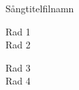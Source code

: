\begin{song}{Sångtitel}{filnamn}
\begin{vers}
Rad 1\\
Rad 2\\
\end{vers}
\newp
\begin{vers}
Rad 3\\
Rad 4\\
\end{vers}
\end{song}
